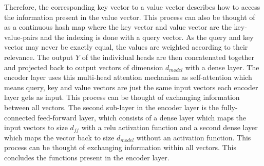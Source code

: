 \documentclass[draft,final]{vutinfth} %
\begin{document}
    Therefore, the corresponding key vector to a value vector describes how to access the information present in the value vector.
    This process can also be thought of as a continuous hash map where the key vector and value vector are the key-value-pairs and the indexing is done with a query vector.
    As the query and key vector may never be exactly equal, the values are weighted according to their relevance.
    The output $Y$ of the individual heads are then concatenated together and projected back to output vectors of dimension $d_{model}$ with a dense layer. 
    The encoder layer uses this multi-head attention mechanism as self-attention which means query, key and value vectors are just the same input vectors each encoder layer gets as input.
    This process can be thought of exchanging information between all vectors.
    The second sub-layer in the encoder layer is the fully-connected feed-forward layer, which consists of a dense layer which maps the input vectors to size $d_{ff}$ with a relu activation function and a second dense layer which maps the vector back to size $d_{model}$ without an activation function.
    This process can be thought of exchanging information within all vectors.
    This concludes the functions present in the encoder layer.
\end{document}
